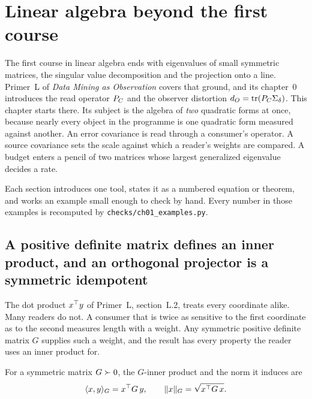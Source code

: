 \chapter{Linear algebra beyond the first course}\label{ch01}
\let\ompSavedSectionmark\sectionmark
\providecommand{\ompnexthead}[1]{\def\ompheadtext{#1}%
  \renewcommand{\sectionmark}[1]{\markright{\MakeUppercase{\thesection.\ \ompheadtext}}}}
\providecommand{\Kc}{K_c}

The first course in linear algebra ends with eigenvalues of small symmetric
matrices, the singular value decomposition and the projection onto a line.
Primer~L of \emph{Data Mining as Observation} covers that ground, and its
chapter~0 introduces the read operator $P_C$ and the observer distortion
$d_O=\operatorname{tr}(P_C\Sigma_\delta)$. This chapter starts there. Its subject is the algebra of
\emph{two} quadratic forms at once, because nearly every object in the
programme is one quadratic form measured against another. An error covariance
is read through a consumer's operator. A source covariance sets the scale
against which a reader's weights are compared. A budget enters a pencil of two
matrices whose largest generalized eigenvalue decides a rate.

Each section introduces one tool, states it as a numbered equation or theorem,
and works an example small enough to check by hand. Every number in those
examples is recomputed by \texttt{checks/ch01\_examples.py}.

\ompnexthead{Inner products and projectors}
\section{A positive definite matrix defines an inner product, and an orthogonal projector is a symmetric idempotent}\label{sec:ch01:proj}

The dot product $x^{\top} y$ of Primer~L, section~L.2, treats every coordinate
alike. Many readers do not. A consumer that is twice as sensitive to the first
coordinate as to the second measures length with a weight. Any symmetric
positive definite matrix $G$ supplies such a weight, and the result has every
property the reader uses an inner product for.

\begin{definition}\label{def:ch01:ginner}
For a symmetric matrix $G\succ 0$, the $G$-inner product and the norm it induces are
\begin{equation}\label{eq:ch01:ginner}
\langle x,y\rangle_G = x^{\top} G\,y,\qquad \lVert x\rVert_G=\sqrt{x^{\top} G\,x}.
\end{equation}
\end{definition}

